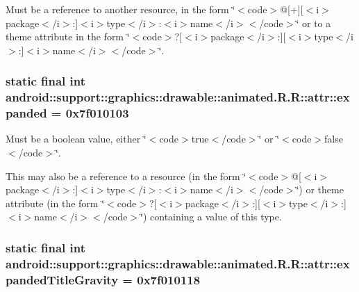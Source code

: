 Must be a reference to another resource, in the form \char`\"{}$<$code$>$@\mbox{[}+\mbox{]}\mbox{[}$<$i$>$package$<$/i$>$:\mbox{]}$<$i$>$type$<$/i$>$:$<$i$>$name$<$/i$>$$<$/code$>$\char`\"{} or to a theme attribute in the form \char`\"{}$<$code$>$?\mbox{[}$<$i$>$package$<$/i$>$:\mbox{]}\mbox{[}$<$i$>$type$<$/i$>$:\mbox{]}$<$i$>$name$<$/i$>$$<$/code$>$\char`\"{}. \hypertarget{classandroid_1_1support_1_1graphics_1_1drawable_1_1animated_1_1_r_1_1attr_9ba55cf938fda080271f5e274af1c62b}{
\subsubsection[{expanded}]{\setlength{\rightskip}{0pt plus 5cm}static final int android::support::graphics::drawable::animated.R.R::attr::expanded = 0x7f010103}}
\label{classandroid_1_1support_1_1graphics_1_1drawable_1_1animated_1_1_r_1_1attr_9ba55cf938fda080271f5e274af1c62b}


Must be a boolean value, either \char`\"{}$<$code$>$true$<$/code$>$\char`\"{} or \char`\"{}$<$code$>$false$<$/code$>$\char`\"{}. 

This may also be a reference to a resource (in the form \char`\"{}$<$code$>$@\mbox{[}$<$i$>$package$<$/i$>$:\mbox{]}$<$i$>$type$<$/i$>$:$<$i$>$name$<$/i$>$$<$/code$>$\char`\"{}) or theme attribute (in the form \char`\"{}$<$code$>$?\mbox{[}$<$i$>$package$<$/i$>$:\mbox{]}\mbox{[}$<$i$>$type$<$/i$>$:\mbox{]}$<$i$>$name$<$/i$>$$<$/code$>$\char`\"{}) containing a value of this type. \hypertarget{classandroid_1_1support_1_1graphics_1_1drawable_1_1animated_1_1_r_1_1attr_1794566dd8d333d9015c5a45cf356799}{
\subsubsection[{expandedTitleGravity}]{\setlength{\rightskip}{0pt plus 5cm}static final int android::support::graphics::drawable::animated.R.R::attr::expandedTitleGravity = 0x7f010118}}
\label{classandroid_1_1support_1_1graphics_1_1drawable_1_1animated_1_1_r_1_1attr_1794566dd8d333d9015c5a45cf356799}


